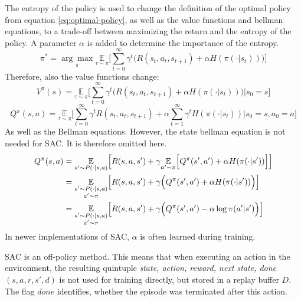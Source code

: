 The entropy of the policy is used to change the definition of the optimal policy from equation \ref{eq:optimal-policy}, as well as the value functions and bellman equations, to a trade-off between maximizing the return and the entropy of the policy. A parameter $\alpha$ is added to determine the importance of the entropy.
\begin{equation}
    \pi^* = \underset{\pi}{\arg\max} \underset{\tau\sim\pi}{\mathbb{E}}\Big[\sum^\infty_{t=0}\gamma^t \Big(R(s_t,a_t,s_{t+1}) + 
    \alpha H(\pi(\cdot|s_t))\Big)\Big]
    \label{eq:sac-optimal-policy}
\end{equation}
Therefore, also the value functions change:
\begin{equation}
    V^\pi(s)=\underset{\tau\sim\pi}{\mathbb{E}}\Big[\sum^\infty_{t=0}\gamma^t \Big(R(s_t,a_t,s_{t+1}) + 
    \alpha H(\pi(\cdot|s_t))\Big)\Big|s_0=s\Big]
\end{equation}
\begin{equation}
    Q^\pi(s,a)=\underset{\tau\sim\pi}{\mathbb{E}}\Big[\sum^\infty_{t=0}\gamma^t R(s_t,a_t,s_{t+1}) + 
    \alpha \sum^\infty_{t=1}\gamma^t H(\pi(\cdot|s_t))\Big|s_0=s, a_0=a\Big]
\end{equation}
As well as the Bellman equations. However, the state bellman equation is not needed for SAC. It is therefore omitted here.
\begin{align}
    Q^\pi(s,a) &= \underset{s'\sim P(\cdot|s,a)}{\mathbb{E}}\Big[R(s,a,s') + \gamma\underset{a'\sim\pi}{\mathbb{E}}\Big[Q^\pi(s',a') + \alpha H(\pi(\cdot|s'))\Big]\Big]
    \label{eq:sac-bellman-q-1}\\
    &= \underset{\begin{subarray}{c}
        s'\sim P(\cdot|s,a)\\
        a'\sim\pi
    \end{subarray}}{\mathbb{E}}\Big[R(s,a,s') + \gamma\Big(Q^\pi(s',a') + \alpha H(\pi(\cdot|s'))\Big)\Big]
    \label{eq:sac-bellman-q-2}\\
    &= \underset{\begin{subarray}{c}
        s'\sim P(\cdot|s,a)\\
        a'\sim\pi
    \end{subarray}}{\mathbb{E}}\Big[R(s,a,s') + \gamma\Big(Q^\pi(s',a') - \alpha \log\pi(a'|s')\Big)\Big]
    \label{eq:sac-bellman-q-3}
\end{align}
In newer implementations of SAC, $\alpha$ is often learned during training. \cite{haarnojaLearningWalkDeep2019}

SAC is an off-policy method. This means that when executing an action in the environment, the resulting quintuple \emph{state, action, reward, next state, done} $(s,a,r,s',d)$ is not used for training directly, but stored in a replay buffer $D$. The flag $done$ identifies, whether the episode was terminated after this action.


